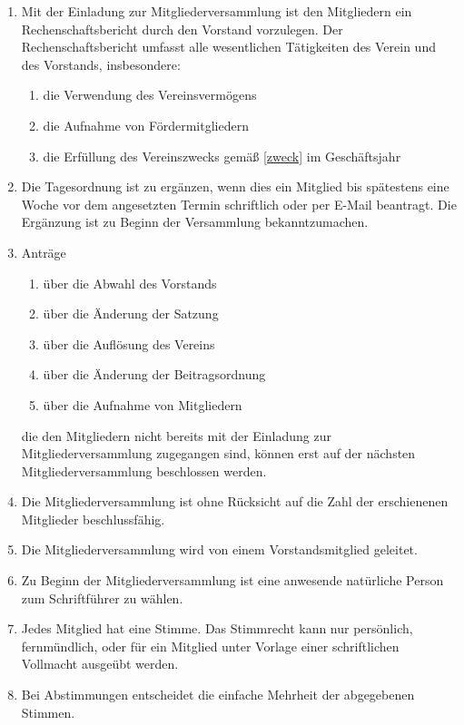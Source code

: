\documentclass[german]{article}
\begin{document}
\begin{enumerate}
\begin{enumerate}
\item Mit der Einladung zur Mitgliederversammlung ist den Mitgliedern ein Rechenschaftsbericht durch den Vorstand vorzulegen.
Der Rechenschaftsbericht umfasst alle wesentlichen Tätigkeiten des Verein und des Vorstands, insbesondere:
\begin{enumerate}
\item die Verwendung des Vereinsvermögens
\item die Aufnahme von Fördermitgliedern
\item die Erfüllung des Vereinszwecks gemäß \ref{zweck} im Geschäftsjahr
\end{enumerate}

\item Die Tagesordnung ist zu ergänzen, wenn dies ein Mitglied bis spätestens eine Woche vor dem angesetzten Termin schriftlich oder per E-Mail beantragt.
Die Ergänzung ist zu Beginn der Versammlung bekanntzumachen.

\item Anträge
\begin{enumerate}
\item über die Abwahl des Vorstands
\item über die Änderung der Satzung
\item über die Auflösung des Vereins
\item über die Änderung der Beitragsordnung
\item über die Aufnahme von Mitgliedern
\end{enumerate}
die den Mitgliedern nicht bereits mit der Einladung zur Mitgliederversammlung zugegangen sind, können erst auf der nächsten Mitgliederversammlung beschlossen werden.

\item Die Mitgliederversammlung ist ohne Rücksicht auf die Zahl der erschienenen Mitglieder beschlussfähig.

\item Die Mitgliederversammlung wird von einem Vorstandsmitglied geleitet.

\item Zu Beginn der Mitgliederversammlung ist eine anwesende natürliche Person zum Schriftführer zu wählen.

\item Jedes Mitglied hat eine Stimme. Das Stimmrecht kann nur persönlich, fernmündlich, oder für ein Mitglied unter Vorlage einer schriftlichen Vollmacht ausgeübt werden.

\item Bei Abstimmungen entscheidet die einfache Mehrheit der abgegebenen Stimmen.


\end{enumerate}
\end{enumerate}
\end{document}
